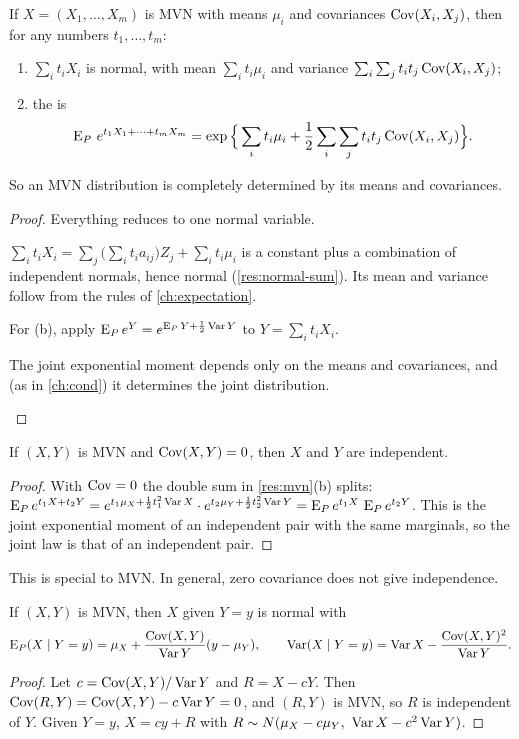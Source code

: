 \begin{result}
\label{res:mvn}
If $X=(X_1,\dots,X_m)$ is MVN with means $\mu_i$ and covariances $\operatorname{Cov}(X_i,X_j)$, then for any numbers $t_1,\dots,t_m$:
\begin{enumerate}[label=(\alph*)]
  \item $\sum_it_iX_i$ is normal, with mean $\sum_it_i\mu_i$ and variance $\sum_i\sum_jt_it_j\operatorname{Cov}(X_i,X_j)$;
  \item the  is
  \[
    \operatorname{E}_P\,e^{t_1X_1+\dots+t_mX_m}=\exp\Big\{\sum_it_i\mu_i+\frac12\sum_i\sum_jt_it_j\operatorname{Cov}(X_i,X_j)\Big\}.
  \]
\end{enumerate}
So an MVN distribution is completely determined by its means and covariances.
\end{result}
\begin{proof}
Everything reduces to one normal variable.
\begin{steps}
  \item $\sum_it_iX_i=\sum_j\big(\sum_it_ia_{ij}\big)Z_j+\sum_it_i\mu_i$ is a constant plus a combination of independent normals, hence normal (\cref{res:normal-sum}). Its mean and variance follow from the rules of \cref{ch:expectation}.
  \item For (b), apply $\operatorname{E}_Pe^{Y}=e^{\operatorname{E}_PY+\frac12\operatorname{Var} Y}$ to $Y=\sum_it_iX_i$.
  \item The joint exponential moment depends only on the means and covariances, and (as in \cref{ch:cond}) it determines the joint distribution. \qedhere
\end{steps}
\end{proof}

\begin{result}
\label{res:uncorr}
If $(X,Y)$ is MVN and $\operatorname{Cov}(X,Y)=0$, then $X$ and $Y$ are independent.
\end{result}
\begin{proof}
With $\operatorname{Cov}=0$ the double sum in \cref{res:mvn}(b) splits: $\operatorname{E}_Pe^{t_1X+t_2Y}=e^{t_1\mu_X+\frac12t_1^2\operatorname{Var} X}\cdot e^{t_2\mu_Y+\frac12t_2^2\operatorname{Var} Y}=\operatorname{E}_Pe^{t_1X}\,\operatorname{E}_Pe^{t_2Y}$. This is the joint exponential moment of an independent pair with the same marginals, so the joint law is that of an independent pair.
\end{proof}

This is special to MVN. In general, zero covariance does not give independence.

\begin{result}
\label{res:mvn-cond}
If $(X,Y)$ is MVN, then $X$ given $Y=y$ is normal with
\[
  \operatorname{E}_P(X\mid Y=y)=\mu_X+\frac{\operatorname{Cov}(X,Y)}{\operatorname{Var} Y}(y-\mu_Y),\qquad \operatorname{Var}(X\mid Y=y)=\operatorname{Var} X-\frac{\operatorname{Cov}(X,Y)^2}{\operatorname{Var} Y}.
\]
\end{result}
\begin{proof}
Let $c=\operatorname{Cov}(X,Y)/\operatorname{Var} Y$ and $R=X-cY$. Then $\operatorname{Cov}(R,Y)=\operatorname{Cov}(X,Y)-c\operatorname{Var} Y=0$, and $(R,Y)$ is MVN, so $R$ is independent of $Y$. Given $Y=y$, $X=cy+R$ with $R\sim N(\mu_X-c\mu_Y,\ \operatorname{Var} X-c^2\operatorname{Var} Y)$.
\end{proof}

